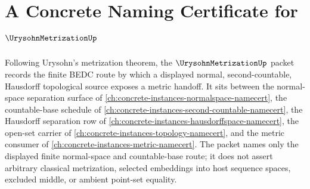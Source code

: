 \chapter{A Concrete Naming Certificate for $\UrysohnMetrizationUp$}
\label{ch:concrete-instances-urysohn-metrization-namecert}

Following Urysohn's metrization theorem, the $\UrysohnMetrizationUp$ packet records the finite BEDC route by which a displayed normal, second-countable, Hausdorff topological source exposes a metric handoff. It sits between the normal-space separation surface of \autoref{ch:concrete-instances-normalspace-namecert}, the countable-base schedule of \autoref{ch:concrete-instances-second-countable-namecert}, the Hausdorff separation row of \autoref{ch:concrete-instances-hausdorffspace-namecert}, the open-set carrier of \autoref{ch:concrete-instances-topology-namecert}, and the metric consumer of \autoref{ch:concrete-instances-metric-namecert}. The packet names only the displayed finite normal-space and countable-base route; it does not assert arbitrary classical metrization, selected embeddings into host sequence spaces, excluded middle, or ambient point-set equality.


